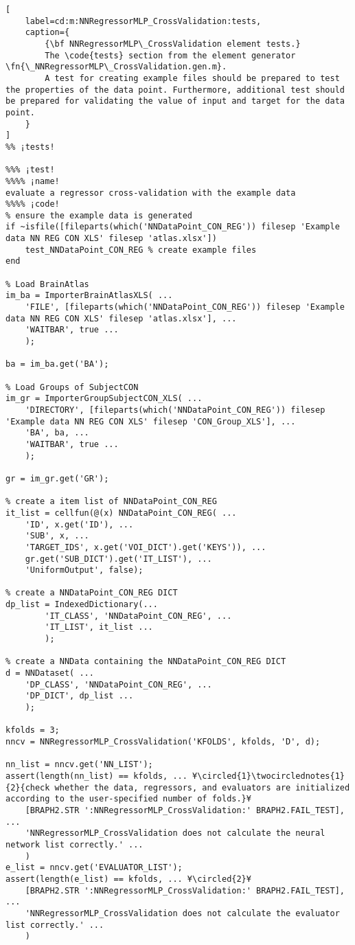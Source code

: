 \documentclass{tufte-handout}
\begin{document}
\begin{lstlisting}[
	label=cd:m:NNRegressorMLP_CrossValidation:tests,
	caption={
		{\bf NNRegressorMLP\_CrossValidation element tests.}
		The \code{tests} section from the element generator \fn{\_NNRegressorMLP\_CrossValidation.gen.m}.
		A test for creating example files should be prepared to test the properties of the data point. Furthermore, additional test should be prepared for validating the value of input and target for the data point.
	}
]			
%% ¡tests!

%%% ¡test!
%%%% ¡name!
evaluate a regressor cross-validation with the example data
%%%% ¡code!
% ensure the example data is generated
if ~isfile([fileparts(which('NNDataPoint_CON_REG')) filesep 'Example data NN REG CON XLS' filesep 'atlas.xlsx'])
    test_NNDataPoint_CON_REG % create example files
end

% Load BrainAtlas
im_ba = ImporterBrainAtlasXLS( ...
    'FILE', [fileparts(which('NNDataPoint_CON_REG')) filesep 'Example data NN REG CON XLS' filesep 'atlas.xlsx'], ...
    'WAITBAR', true ...
    );

ba = im_ba.get('BA');

% Load Groups of SubjectCON
im_gr = ImporterGroupSubjectCON_XLS( ...
    'DIRECTORY', [fileparts(which('NNDataPoint_CON_REG')) filesep 'Example data NN REG CON XLS' filesep 'CON_Group_XLS'], ...
    'BA', ba, ...
    'WAITBAR', true ...
    );

gr = im_gr.get('GR');

% create a item list of NNDataPoint_CON_REG
it_list = cellfun(@(x) NNDataPoint_CON_REG( ...
    'ID', x.get('ID'), ...
    'SUB', x, ...
    'TARGET_IDS', x.get('VOI_DICT').get('KEYS')), ...
    gr.get('SUB_DICT').get('IT_LIST'), ...
    'UniformOutput', false);

% create a NNDataPoint_CON_REG DICT
dp_list = IndexedDictionary(...
        'IT_CLASS', 'NNDataPoint_CON_REG', ...
        'IT_LIST', it_list ...
        );

% create a NNData containing the NNDataPoint_CON_REG DICT
d = NNDataset( ...
    'DP_CLASS', 'NNDataPoint_CON_REG', ...
    'DP_DICT', dp_list ...
    );

kfolds = 3;
nncv = NNRegressorMLP_CrossValidation('KFOLDS', kfolds, 'D', d);

nn_list = nncv.get('NN_LIST');
assert(length(nn_list) == kfolds, ... ¥\circled{1}\twocirclednotes{1}{2}{check whether the data, regressors, and evaluators are initialized according to the user-specified number of folds.}¥
    [BRAPH2.STR ':NNRegressorMLP_CrossValidation:' BRAPH2.FAIL_TEST], ...
    'NNRegressorMLP_CrossValidation does not calculate the neural network list correctly.' ...
    )
e_list = nncv.get('EVALUATOR_LIST');
assert(length(e_list) == kfolds, ... ¥\circled{2}¥
    [BRAPH2.STR ':NNRegressorMLP_CrossValidation:' BRAPH2.FAIL_TEST], ...
    'NNRegressorMLP_CrossValidation does not calculate the evaluator list correctly.' ...
    )

\end{lstlisting}
\end{document}
